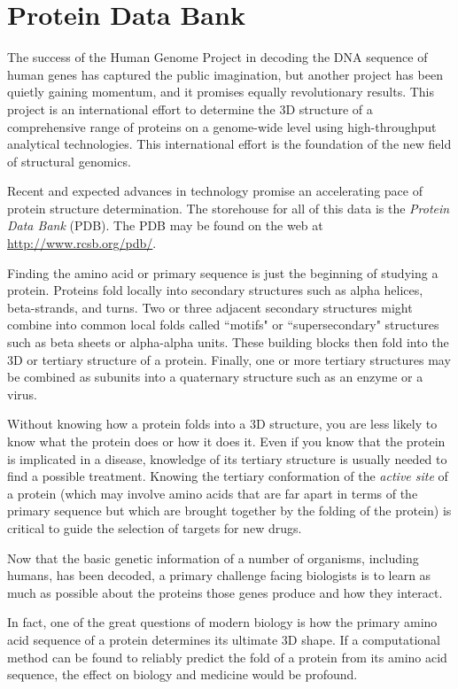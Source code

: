 \chapter{Protein Data Bank}
\label{chap:chapter11}
\minitoc

The success of the Human Genome Project in decoding the DNA sequence of human genes has captured the public imagination, but another project has been quietly gaining momentum, and it promises equally revolutionary results. This project is an international effort to determine the 3D structure of a comprehensive range of proteins on a genome-wide level using high-throughput analytical technologies. This international effort is the foundation of the new field of structural genomics.

Recent and expected advances in technology promise an accelerating pace of protein structure determination. The storehouse for all of this data is the \textit{Protein Data Bank} (PDB). The PDB may be found on the web at \href{http://www.rcsb.org/pdb/}{http://www.rcsb.org/pdb/}.

Finding the amino acid or primary sequence is just the beginning of studying a protein. Proteins fold locally into secondary structures such as alpha helices, beta-strands, and turns. Two or three adjacent secondary structures might combine into common local folds called ``motifs" or ``supersecondary" structures such as beta sheets or alpha-alpha units. These building blocks then fold into the 3D or tertiary structure of a protein. Finally, one or more tertiary structures may be combined as subunits into a quaternary structure such as an enzyme or a virus.

Without knowing how a protein folds into a 3D structure, you are less likely to know what the protein does or how it does it. Even if you know that the protein is implicated in a disease, knowledge of its tertiary structure is usually needed to find a possible treatment. Knowing the tertiary conformation of the \textit{active site} of a protein (which may involve amino acids that are far apart in terms of the primary sequence but which are brought together by the folding of the protein) is critical to guide the selection of targets for new drugs.

Now that the basic genetic information of a number of organisms, including humans, has been decoded, a primary challenge facing biologists is to learn as much as possible about the proteins those genes produce and how they interact.

In fact, one of the great questions of modern biology is how the primary amino acid sequence of a protein determines its ultimate 3D shape. If a computational method can be found to reliably predict the fold of a protein from its amino acid sequence, the effect on biology and medicine would be profound.

